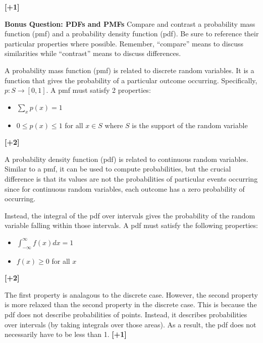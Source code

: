 \documentclass[addpoints,12pt]{exam}
\begin{document}
\begin{questions}
\begin{parts}
\begin{solution}
			\textbf{[+1]}
		\end{solution}
	\end{parts}
	
	\bonusquestion[5] \textbf{Bonus Question: PDFs and PMFs} Compare and contrast a probability mass function (pmf) and a probability density function (pdf). Be sure to reference their particular properties where possible. Remember, ``compare'' means to discuss similarities while ``contrast'' means to discuss differences.
				\begin{solution}
					A probability mass function (pmf) is related to discrete random variables. It is a function that gives the probability of a particular outcome occurring. Specifically, $p: S \rightarrow [0, 1]$. A pmf must satisfy 2 properties: 
					\begin{itemize}
						\item $\sum_{x} p(x) = 1$
						\item $0 \leq p(x) \leq 1$ for all $x \in S$ where $S$ is the support of the random variable
					\end{itemize}					
					\textbf{[+2]}
					
					 A probability density function (pdf) is related to continuous random variables. Similar to a pmf, it can be used to compute probabilities, but the crucial difference is that its values are not the probabilities of particular events occurring since for continuous random variables, each outcome has a zero probability of occurring.
					 
					 Instead, the integral of the pdf over intervals gives the probability of the random variable falling within those intervals. A pdf must satisfy the following properties:
					 \begin{itemize}
					 	\item $\int_{-\infty}^\infty f(x) dx = 1$
					 	\item $f(x) \geq 0$ for all $x$
					 \end{itemize}
					 \textbf{[+2]}
					 
					 The first property is analagous to the discrete case. However, the second property is more relaxed than the second property in the discrete case. This is because the pdf does not describe probabilities of points. Instead, it describes probabilities over intervals (by taking integrals over those areas). As a result, the pdf does not necessarily have to be less than 1.
					 \textbf{[+1]}
				\end{solution}
\end{questions}
\end{document}
